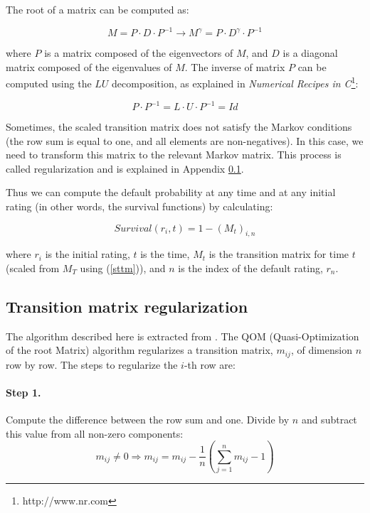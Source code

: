 \documentclass[a4paper,12pt,final]{article}
\begin{document}
The root of a matrix can be computed as:

\begin{displaymath}
M = P \cdot D \cdot P^{-1}
\longrightarrow
M^{\gamma} = P \cdot D^{\gamma} \cdot P^{-1}
\end{displaymath}

where $P$ is a matrix composed of the eigenvectors of $M$, and $D$ is a diagonal 
matrix composed of the eigenvalues of $M$. The inverse of matrix $P$ can be 
computed using the $LU$ decomposition, as explained in \emph{Numerical 
Recipes in C}\footnote{http://www.nr.com}:

\begin{displaymath}
P \cdot P^{-1} = L \cdot U \cdot P^{-1} = Id
\end{displaymath}

Sometimes, the scaled transition matrix does not satisfy the Markov conditions
(the row sum is equal to one, and all elements are non-negatives). In this case, 
we need to transform this matrix to the relevant Markov matrix. This process is 
called regularization and is explained in Appendix \ref{ap:regularization}.
\newline

Thus we can compute the default probability at any time and at any initial 
rating (in other words, the survival functions) by calculating:

\begin{displaymath}
Survival(r_i, t) = 1 - \left( M_t \right)_{i, n}
\end{displaymath}

where $r_i$ is the initial rating, $t$ is the time, $M_t$ is the transition 
matrix for time $t$ (scaled from $M_T$ using (\ref{sttm})), and $n$ is the 
index of the default rating, $r_n$.

\subsection{Transition matrix regularization}
\label{ap:regularization}
The algorithm described here is extracted from \cite{trans:regularization}.
The QOM (Quasi-Optimization of the root Matrix) algorithm regularizes a 
transition matrix, $m_{ij}$, of dimension $n$ row by row. The steps to 
regularize the $i$-th row are:

\paragraph{Step 1.} Compute the difference between the row sum and one. 
Divide by $n$ and subtract this value from all non-zero components:
\begin{displaymath}
m_{ij} \ne 0 
\Longrightarrow 
m_{ij} = m_{ij} - \frac{1}{n} \left( \sum_{j=1}^{n} m_{ij} - 1\right)
\end{displaymath}
\end{document}
